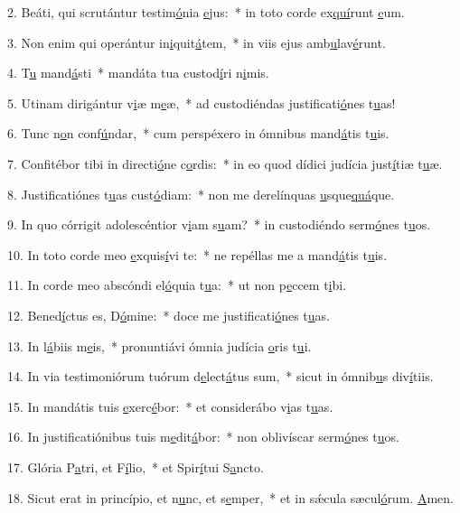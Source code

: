 2. Beáti, qui scrutántur testim\uline{ó}nia \uline{e}jus:~* in toto corde ex\uline{quí}runt \uline{e}um.\par 
3. Non enim qui operántur in\uline{i}quit\uline{á}tem,~* in viis ejus amb\uline{u}lav\uline{é}runt.\par 
4. T\uline{u} mand\uline{á}sti~* mandáta tua custod\uline{í}ri n\uline{i}mis.\par 
5. Utinam dirigántur v\uline{i}æ m\uline{e}æ,~* ad custodiéndas justificati\uline{ó}nes t\uline{u}as!\par 
6. Tunc n\uline{o}n conf\uline{ú}ndar,~* cum perspéxero in ómnibus mand\uline{á}tis t\uline{u}is.\par 
7. Confitébor tibi in directi\uline{ó}ne c\uline{o}rdis:~* in eo quod dídici judícia just\uline{í}tiæ t\uline{u}æ.\par 
8. Justificatiónes t\uline{u}as cust\uline{ó}diam:~* non me derelínquas \uline{u}sque\uline{quá}que.\par 
9. In quo córrigit adolescéntior v\uline{i}am s\uline{u}am?~* in custodiéndo serm\uline{ó}nes t\uline{u}os.\par 
10. In toto corde meo \uline{e}xquis\uline{í}vi te:~* ne repéllas me a mand\uline{á}tis t\uline{u}is.\par 
11. In corde meo abscóndi el\uline{ó}quia t\uline{u}a:~* ut non p\uline{e}ccem t\uline{i}bi.\par 
12. Bened\uline{í}ctus es, D\uline{ó}mine:~* doce me justificati\uline{ó}nes t\uline{u}as.\par 
13. In l\uline{á}biis m\uline{e}is,~* pronuntiávi ómnia judícia \uline{o}ris t\uline{u}i.\par 
14. In via testimoniórum tuórum d\uline{e}lect\uline{á}tus sum,~* sicut in ómnib\uline{u}s div\uline{í}tiis.\par 
15. In mandátis tuis \uline{e}xerc\uline{é}bor:~* et considerábo v\uline{i}as t\uline{u}as.\par 
16. In justificatiónibus tuis m\uline{e}dit\uline{á}bor:~* non oblivíscar serm\uline{ó}nes t\uline{u}os.\par 
17. Glória P\uline{a}tri, et F\uline{í}lio,~* et Spir\uline{í}tui S\uline{a}ncto.\par 
18. Sicut erat in princípio, et n\uline{u}nc, et s\uline{e}mper,~* et in sǽcula sæcul\uline{ó}rum. \uline{A}men.\par 
